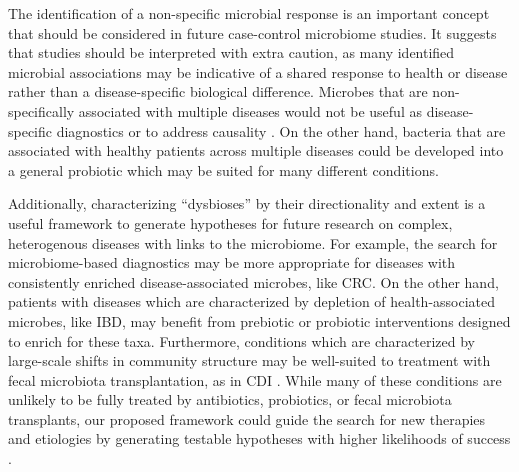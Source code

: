 \documentclass{article}
\begin{document}
The identification of a non-specific microbial response is an important concept that should be considered in future case-control microbiome studies.
It suggests that studies should be interpreted with extra caution, as many identified microbial associations may be indicative of a shared response to health or disease rather than a disease-specific biological difference.
Microbes that are non-specifically associated with multiple diseases would not be useful as disease-specific diagnostics or to address causality \cite{olesen2016dysbiosis}. 
On the other hand, bacteria that are associated with healthy patients across multiple diseases could be developed into a general probiotic which may be suited for many different conditions.

Additionally, characterizing ``dysbioses'' by their directionality and extent is a useful framework to generate hypotheses for future research on complex, heterogenous diseases with links to the microbiome.
For example, the search for microbiome-based diagnostics may be more appropriate for diseases with consistently enriched disease-associated microbes, like CRC. 
On the other hand, patients with diseases which are characterized by depletion of health-associated microbes, like IBD, may benefit from prebiotic or probiotic interventions designed to enrich for these taxa. 
Furthermore, conditions which are characterized by large-scale shifts in community structure may be well-suited to treatment with fecal microbiota transplantation, as in CDI \cite{cdi-youngster}.
While many of these conditions are unlikely to be fully treated by antibiotics, probiotics, or fecal microbiota transplants, our proposed framework could guide the search for new therapies and etiologies by generating testable hypotheses with higher likelihoods of success \cite{olesen2016dysbiosis}.
\end{document}
